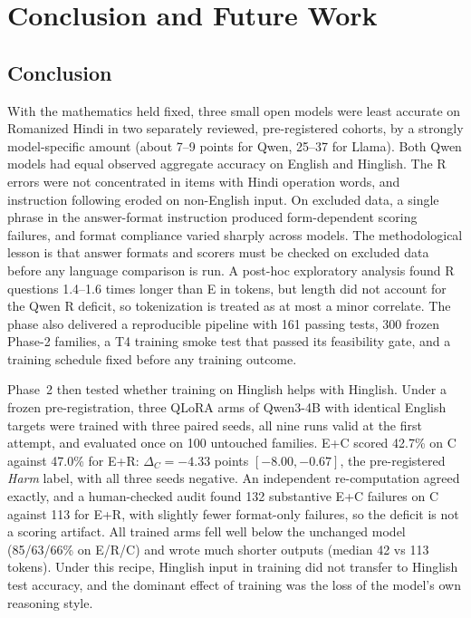 \documentclass[12pt,a4paper,oneside]{report}
\renewcommand{\_}{\oldunderscore\allowbreak}
\begin{document}
\chapter{Conclusion and Future Work}
\label{ch:conclusion}

\section{Conclusion}

With the mathematics held fixed, three small open models were least accurate on Romanized Hindi in two separately reviewed, pre-registered cohorts, by a strongly model-specific amount (about 7--9 points for Qwen, 25--37 for Llama). Both Qwen models had equal observed aggregate accuracy on English and Hinglish. The R errors were not concentrated in items with Hindi operation words, and instruction following eroded on non-English input. On excluded data, a single phrase in the answer-format instruction produced form-dependent scoring failures, and format compliance varied sharply across models. The methodological lesson is that answer formats and scorers must be checked on excluded data before any language comparison is run. A post-hoc exploratory analysis found R questions 1.4--1.6 times longer than E in tokens, but length did not account for the Qwen R deficit, so tokenization is treated as at most a minor correlate. The phase also delivered a reproducible pipeline with 161 passing tests, 300 frozen Phase-2 families, a T4 training smoke test that passed its feasibility gate, and a training schedule fixed before any training outcome.

Phase~2 then tested whether training on Hinglish helps with Hinglish. Under a frozen pre-registration, three QLoRA arms of Qwen3-4B with identical English targets were trained with three paired seeds, all nine runs valid at the first attempt, and evaluated once on 100 untouched families. E+C scored 42.7\% on C against 47.0\% for E+R: $\Delta_C = -4.33$ points $[-8.00, -0.67]$, the pre-registered \emph{Harm} label, with all three seeds negative. An independent re-computation agreed exactly, and a human-checked audit found 132 substantive E+C failures on C against 113 for E+R, with slightly fewer format-only failures, so the deficit is not a scoring artifact. All trained arms fell well below the unchanged model (85/63/66\% on E/R/C) and wrote much shorter outputs (median 42 vs 113 tokens). Under this recipe, Hinglish input in training did not transfer to Hinglish test accuracy, and the dominant effect of training was the loss of the model's own reasoning style.
\end{document}
